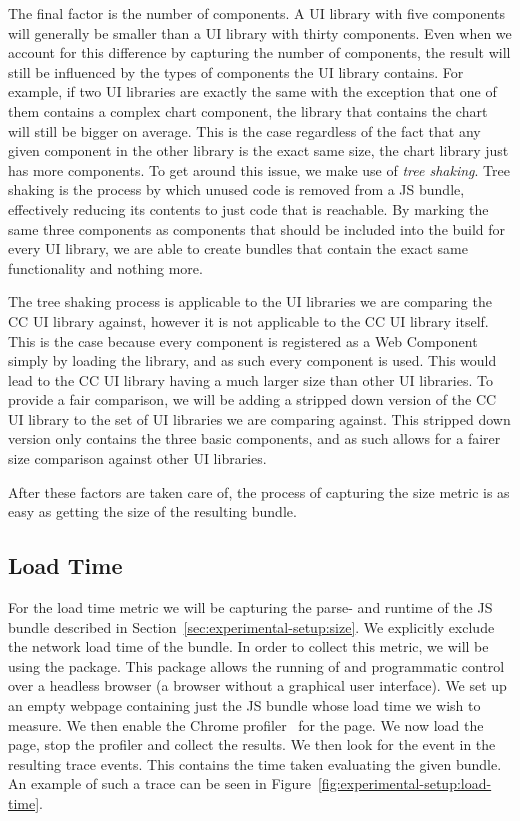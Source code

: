 The final factor is the number of components. A UI library with five components will generally be smaller than a UI library with thirty components. Even when we account for this difference by capturing the number of components, the result will still be influenced by the types of components the UI library contains. For example, if two UI libraries are exactly the same with the exception that one of them contains a complex chart component, the library that contains the chart will still be bigger on average. This is the case regardless of the fact that any given component in the other library is the exact same size, the chart library just has more components. To get around this issue, we make use of \emph{tree shaking}. Tree shaking is the process by which unused code is removed from a JS bundle, effectively reducing its contents to just code that is reachable. By marking the same three components as components that should be included into the build for every UI library, we are able to create bundles that contain the exact same functionality and nothing more.

The tree shaking process is applicable to the UI libraries we are comparing the CC UI library against, however it is not applicable to the CC UI library itself. This is the case because every component is registered as a Web Component simply by loading the library, and as such every component is used. This would lead to the CC UI library having a much larger size than other UI libraries. To provide a fair comparison, we will be adding a stripped down version of the CC UI library to the set of UI libraries we are comparing against. This stripped down version only contains the three basic components, and as such allows for a fairer size comparison against other UI libraries.

After these factors are taken care of, the process of capturing the size metric is as easy as getting the size of the resulting bundle.

\subsection{Load Time}
For the load time metric we will be capturing the parse- and runtime of the JS bundle described in Section~\ref{sec:experimental-setup:size}. We explicitly exclude the network load time of the bundle. In order to collect this metric, we will be using the  package. This package allows the running of and programmatic control over a headless browser (a browser without a graphical user interface). We set up an empty webpage containing just the JS bundle whose load time we wish to measure. We then enable the Chrome profiler~ for the page. We now load the page, stop the profiler and collect the results. We then look for the  event in the resulting trace events. This contains the time taken evaluating the given bundle. An example of such a trace can be seen in Figure~\ref{fig:experimental-setup:load-time}.

